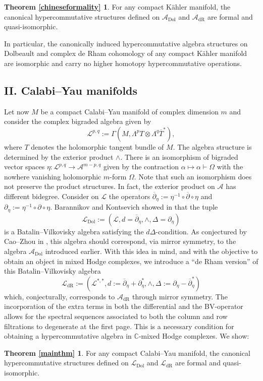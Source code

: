 \documentclass[a4paper]{amsart}
\theoremstyle{definition}
\theoremstyle{theorem}
\newcommand{\CC}{\mathbb{C}}
\newcommand{\Aa}{\mathcal{A}}
\newcommand{\Ll}{\mathcal{L}}
\newcommand{\ov}{\overline}
\newcommand{\del}{\partial}
\newcommand{\delb}{{\overline\partial}}
\newcommand{\Dol}{\mathrm{Dol}}
\newcommand{\dR}{\mathrm{dR}}
\begin{document}
\newtheorem*{I1}{\normalfont\bfseries Theorem \ref{chineseformality}}
\begin{I1}
For any compact Kähler manifold, the canonical hypercommutative structures defined on $\Aa_{\Dol}$ and $\Aa_{\dR}$
are formal and quasi-isomorphic.
\end{I1}

In particular, the canonically induced hypercommutative algebra structures on Dolbeault and complex de Rham cohomology of any compact Kähler manifold are isomorphic and carry no higher homotopy hypercommutative operations.



\subsection*{II. Calabi--Yau manifolds}
Let now $M$ be a compact Calabi--Yau manifold of complex dimension $m$ and consider the
complex bigraded algebra given by 
\[\Ll^{p,q}:=\Gamma(M,\Lambda^p T\otimes \Lambda^q\ov{T}^*),\]
where $T$ denotes the holomorphic tangent bundle of $M$. The algebra structure is determined by 
the exterior product $\wedge$.
There is an isomorphism of bigraded vector spaces $\eta:\Ll^{p,q}\to \Aa^{m-p,q}$ given by the contraction $\alpha\mapsto \alpha \vdash \Omega$
with the nowhere vanishing holomorphic $m$-form $\Omega$. Note that such an isomorphism does not preserve the product structures. In fact, the exterior product on $\Aa$ has different bidegree. Consider on $\Ll$ the operators
$\delb_\eta:=\eta^{-1}\circ \delb\circ \eta$ and $\del_\eta:=\eta^{-1}\circ \del\circ \eta$.
Barannikov and Kontsevich showed in \cite{BaKo} that the tuple 
\[\Ll_{\Dol}:=(\Ll,d=\delb_\eta,\wedge, \Delta=\del_\eta)\] is a Batalin--Vilkovisky algebra satisfying the $d\Delta$-condition.
As conjectured by Cao--Zhou in \cite{CaZh}, this algebra should correspond, via mirror symmetry, to the
algebra $\Aa_{\mathrm{Dol}}$ introduced earlier. With this idea in mind, and with the objective to obtain an object in mixed Hodge complexes, we introduce a ``de Rham version'' of this Batalin--Vilkovisky algebra
\[\Ll_{\dR}:=(\Ll^{*,*},d:=\delb_\eta+\del^*_\eta,\wedge,\Delta:=\del_\eta-\delb^*_\eta)\]
which, conjecturally, corresponds to $\Aa_{\dR}$ through mirror symmetry. The incorporation of the extra terms in both the differential and the BV-operator 
allows for the spectral sequences associated to both the column and row filtrations to degenerate at the first page. This is a necessary condition for obtaining a hypercommutative algebra in $\CC$-mixed Hodge complexes.
We show:
\newtheorem*{I2}{\normalfont\bfseries Theorem \ref{mainthm}}
\begin{I2}
For any compact Calabi--Yau manifold, the canonical hypercommutative structures defined on $\Ll_{\Dol}$ and $\Ll_{\dR}$ are formal and quasi-isomorphic.
\end{I2}
\end{document}
